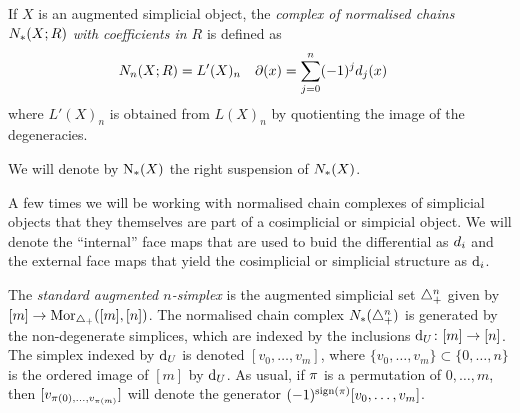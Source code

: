 If $X$ is an augmented simplicial object, the \emph{complex of normalised chains $\cadenas(X;R)$ with coefficients in $R$} is defined as
\begin{align*}
	\cadenas[n](X;R) &= L'(X)_n
	&
	\partial(x) &= \sum_{j=0}^{n} (-1)^jd_j(x)
\end{align*}
where $L'(X)_n$ is obtained from $L(X)_n$ by quotienting the image of the degeneracies.
\begin{notation}\label{notation:chains}
	We will denote by $\chains(X)$ the right suspension of $\cadenas(X)$.
\end{notation}

\begin{notation}
	A few times we will be working with normalised chain complexes of simplicial objects that they themselves are part of a cosimplicial or simpicial object. We will denote the ``internal'' face maps that are used to buid the differential as $\diff_i$ and the external face maps that yield the cosimplicial or simplicial structure as $\d_i$. 
\end{notation}





The \emph{standard augmented $n$-simplex} is the augmented simplicial set $\simplex^n_+$ given by $[m]\to \mathrm{Mor}_{\asimplex}([m],[n])$. The normalised chain complex $\cadenas(\asimplex^n)$ is generated by the non-degenerate simplices, which are indexed by the inclusions $\d_U\colon [m]\to [n]$. The simplex indexed by $\d_U$ is denoted $[v_0,\ldots,v_{m}]$, where $\{v_0,\ldots,v_{m}\}\subset \{0,\ldots,n\}$ is the ordered image of $[m]$ by $\d_U$. As usual, if $\perm$ is a permutation of $0,\ldots,m$, then $[v_{\perm(0),\ldots,v_{\perm(m)}}]$ will denote the generator $(-1)^{\sign{\perm}}[v_0,\ldots,v_m]$.

%

